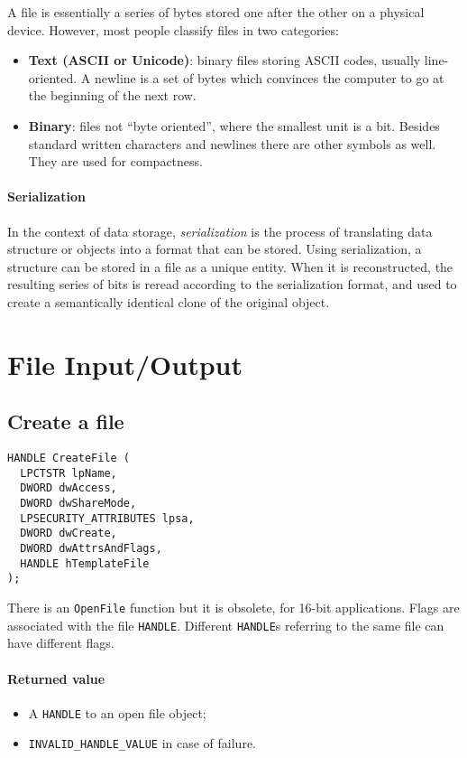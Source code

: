 \bigskip

A file is essentially a series of bytes stored one after the other on a physical device. However, most people classify files in two categories:
\begin{itemize}
\item \textbf{Text (ASCII or Unicode)}: binary files storing ASCII codes, usually line-oriented. A newline is a set of bytes which convinces the computer to go at the beginning of the next row.
\item \textbf{Binary}: files not ``byte oriented'', where the smallest unit is a bit. Besides standard written characters and newlines there are other symbols as well. They are used for compactness.
\end{itemize}

\paragraph{Serialization}
In the context of data storage, \emph{serialization} is the process of translating data structure or objects into a format that can be stored. Using serialization, a structure can be stored in a file as a unique entity. When it is reconstructed, the resulting series of bits is reread according to the serialization format, and used to create a semantically identical clone of the original object.

\section{File Input/Output}
\subsection{Create a file}
\begin{verbatim}
HANDLE CreateFile (
  LPCTSTR lpName,
  DWORD dwAccess,
  DWORD dwShareMode,
  LPSECURITY_ATTRIBUTES lpsa,
  DWORD dwCreate,
  DWORD dwAttrsAndFlags,
  HANDLE hTemplateFile
);
\end{verbatim}

There is an \texttt{OpenFile} function but it is obsolete, for 16-bit applications. Flags are associated with the file \texttt{HANDLE}. Different \texttt{HANDLE}s referring to the same file can have different flags.

\paragraph{Returned value}
\begin{itemize}
\item A \texttt{HANDLE} to an open file object;
\item \texttt{INVALID\_HANDLE\_VALUE} in case of failure.
\end{itemize}

